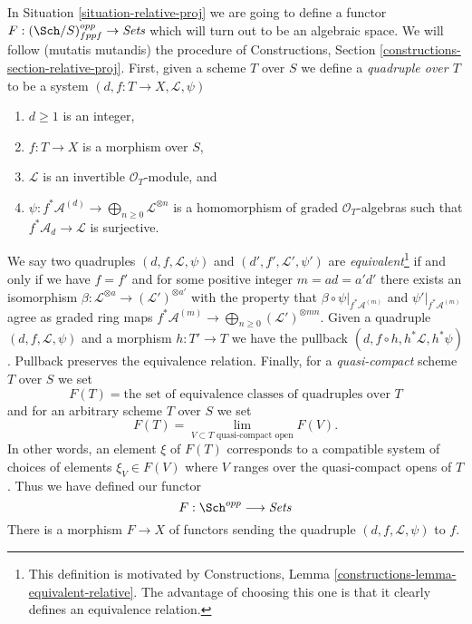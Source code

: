 \noindent
In Situation \ref{situation-relative-proj} we are going to define
a functor $F : (\Sch/S)_{fppf}^{opp} \to \textit{Sets}$ which will
turn out to be an algebraic space. We will follow (mutatis mutandis)
the procedure of
Constructions, Section \ref{constructions-section-relative-proj}.
First, given a scheme $T$ over $S$ we define a
{\it quadruple over $T$} to be a system
$(d, f : T \to X, \mathcal{L}, \psi)$
\begin{enumerate}
\item $d \geq 1$ is an integer,
\item $f : T \to X$ is a morphism over $S$,
\item $\mathcal{L}$ is an invertible $\mathcal{O}_T$-module, and
\item
$\psi : f^*\mathcal{A}^{(d)} \to \bigoplus_{n \geq 0}\mathcal{L}^{\otimes n}$
is a homomorphism of graded $\mathcal{O}_T$-algebras
such that $f^*\mathcal{A}_d \to \mathcal{L}$ is surjective.
\end{enumerate}
We say two quadruples $(d, f, \mathcal{L}, \psi)$ and
$(d', f', \mathcal{L}', \psi')$ are {\it equivalent}\footnote{This
definition is motivated by
Constructions, Lemma \ref{constructions-lemma-equivalent-relative}.
The advantage of choosing this one is that it clearly defines
an equivalence relation.}
if and only if
we have $f = f'$ and for some positive integer $m = ad = a'd'$
there exists an isomorphism
$\beta : \mathcal{L}^{\otimes a} \to (\mathcal{L}')^{\otimes a'}$
with the property that $\beta \circ \psi|_{f^*\mathcal{A}^{(m)}}$
and $\psi'|_{f^*\mathcal{A}^{(m)}}$ agree
as graded ring maps
$f^*\mathcal{A}^{(m)} \to \bigoplus_{n \geq 0} (\mathcal{L}')^{\otimes mn}$.
Given a quadruple $(d, f, \mathcal{L}, \psi)$
and a morphism $h : T' \to T$ we have the pullback
$(d, f \circ h, h^*\mathcal{L}, h^*\psi)$. Pullback preserves 
the equivalence relation. Finally, for a {\it quasi-compact} scheme $T$
over $S$ we set
$$
F(T) = \text{the set of equivalence classes of quadruples over }T
$$
and for an arbitrary scheme $T$ over $S$ we set
$$
F(T)
=
\lim_{V \subset T\text{ quasi-compact open}} F(V).
$$
In other words, an element $\xi$ of $F(T)$ corresponds to a compatible
system of choices of elements $\xi_V \in F(V)$ where $V$ ranges over the
quasi-compact opens of $T$. Thus we have defined our functor
\begin{equation}
\label{equation-proj}
F : \Sch^{opp} \longrightarrow \textit{Sets}
\end{equation}
There is a morphism $F \to X$ of functors sending the quadruple
$(d, f, \mathcal{L}, \psi)$ to $f$.

